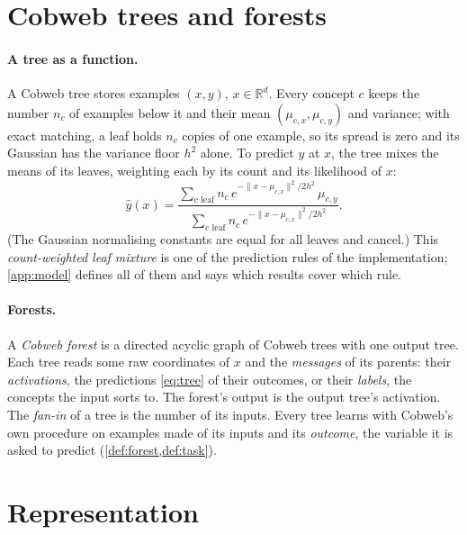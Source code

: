 \documentclass[11pt]{article}
\theoremstyle{definition}
\theoremstyle{remark}
\newcommand{\R}{\mathbb{R}}
\newcommand{\hy}{\hat{y}}
\begin{document}
\section{Cobweb trees and forests}\label{sec:forests}

\paragraph{A tree as a function.}
A Cobweb tree stores examples $(x,y)$, $x\in\R^d$.  Every concept $c$ keeps the number
$n_c$ of examples below it and their mean $(\mu_{c,x},\mu_{c,y})$ and variance; with exact
matching, a leaf holds $n_c$ copies of one example, so its spread is zero and its Gaussian
has the variance floor $h^2$ alone.  To predict $y$ at $x$, the tree mixes the means of its
leaves, weighting each by its count and its likelihood of $x$:
\begin{equation}\label{eq:tree}
  \hy(x)=\frac{\sum_{c\text{ leaf}}n_c\,e^{-\|x-\mu_{c,x}\|^2/2h^2}\,\mu_{c,y}}
              {\sum_{c\text{ leaf}}n_c\,e^{-\|x-\mu_{c,x}\|^2/2h^2}}.
\end{equation}
(The Gaussian normalising constants are equal for all leaves and cancel.)  This
\emph{count-weighted leaf mixture} is one of the prediction rules of the implementation;
\cref{app:model} defines all of them and says which results cover which rule.

\paragraph{Forests.}
A \emph{Cobweb forest} is a directed acyclic graph of Cobweb trees with one output tree.
Each tree reads some raw coordinates of $x$ and the \emph{messages} of its parents: their
\emph{activations}, the predictions \eqref{eq:tree} of their outcomes, or their
\emph{labels}, the concepts the input sorts to.  The forest's output is the output tree's
activation.  The \emph{fan-in} of a tree is the number of its inputs.  Every tree learns
with Cobweb's own procedure on examples made of its inputs and its \emph{outcome}, the
variable it is asked to predict (\cref{def:forest,def:task}).

\section{Representation}\label{sec:repr-main}
\end{document}
